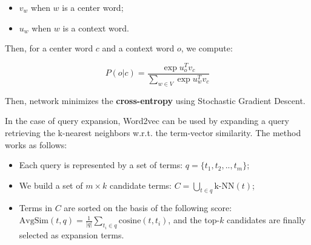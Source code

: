 \begin{itemize}
    \item $v_w$ when $w$ is a center word;
    \item $u_w$ when $w$ is a context word.
\end{itemize}

Then, for a center word $c$ and a context word $o$, we compute:

$$
P(o | c) = \frac{\exp{u_o^T v_c}}{\sum_{w \in V} \exp{u_w^T v_c}}
$$

Then, network minimizes the \textbf{cross-entropy} using Stochastic Gradient Descent. 

In the case of query expansion, Word2vec can be used by expanding a query retrieving the k-nearest neighbors w.r.t. the term-vector similarity. The method works as follows:

\begin{itemize}
    \item Each query is represented by a set of terms: $q = \{ t_1, t_2, .., t_m \}$;
    \item We build a set of $m \times k$ candidate terms: $C = \bigcup_{t \in q} \text{k-NN} (t)$;
    \item Terms in $C$ are sorted on the basis of the following score: $\text{AvgSim}(t,q) = \frac{1}{|q|} \sum_{t_i \in q} \text{cosine}(t, t_i)$, and the top-$k$ candidates are finally selected as expansion terms.
\end{itemize}

